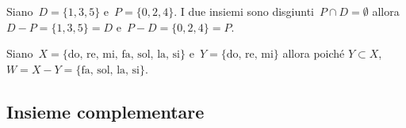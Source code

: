 \begin{exrig}
 \begin{esempio}
Siano~\(D=\{1, 3, 5\}\) e~\(P=\{0, 2, 4\}\). I due insiemi sono 
disgiunti~\(P\cap D=\emptyset\) 
allora~\(D-P=\{1,3,5\}=D\) e~\(P-D=\{0,2,4\}=P\).
 \end{esempio}

 \begin{esempio}
Siano~\(X=\{\text{do, re, mi, fa, sol, la, si}\}\)
e~\(Y=\{\text{do, re, mi}\}\) allora poiché
\(Y\subset X\), \(W=X-Y=\{\text{fa, sol, la, si}\}\).
\begin{center}
 
\end{center}
 \end{esempio}
\end{exrig}


\subsection{Insieme complementare}
\label{subsec:op_complementare}


